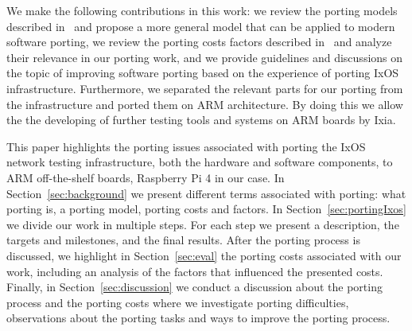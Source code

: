 We make the following contributions in this work: we review the porting models
described in~\cite{tanaka,hakuta,kanai} and propose a more general model that can be
applied to modern software porting, we review the porting costs factors
described in~\cite{hakuta} and analyze their relevance in our porting work, and we
provide guidelines and discussions on the topic of improving software porting
based on the experience of porting IxOS infrastructure. Furthermore, we
separated the relevant parts for our porting from the infrastructure and ported
them on ARM architecture. By doing this we allow the the developing of further
testing tools and systems on ARM boards by Ixia.

This paper highlights the porting issues associated with porting the IxOS
network testing infrastructure, both the hardware and software components, to
ARM off-the-shelf boards, Raspberry Pi 4 in our case. In
Section~\ref{sec:background} we present different terms associated with porting:
what porting is, a porting model, porting costs and factors. In
Section~\ref{sec:portingIxos} we divide our work in multiple steps. For each
step we present a description, the targets and milestones, and the final
results. After the porting process is discussed, we highlight in
Section~\ref{sec:eval} the porting costs associated with our work, including an
analysis of the factors that influenced the presented costs. Finally, in
Section~\ref{sec:discussion} we conduct a discussion about the porting process
and the porting costs where we investigate porting difficulties, observations
about the porting tasks and ways to improve the porting process. 
